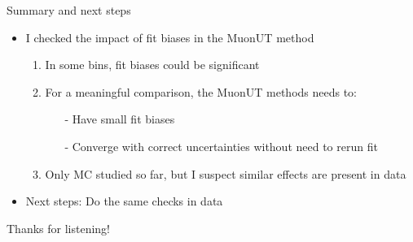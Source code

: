\documentclass[xcolor={dvipsnames}]{beamer}
\begin{document}
\begin{frame}{Summary and next steps}
  \vspace{0.0cm}
  \begin{itemize}
    \setlength\itemsep{1.0em}
    \item{I checked the impact of fit biases in the MuonUT method}
    \begin{enumerate}
      \setlength\itemsep{0.3em}
      \item{In some bins, fit biases could be significant}
      \item{For a meaningful comparison, the MuonUT methods needs to:}
      \begin{itemize}
        \item[-]{Have small fit biases}
        \item[-]{Converge with correct uncertainties without need to rerun fit}
      \end{itemize}
      \item{Only MC studied so far, but I suspect similar effects are present in data}
    \end{enumerate}
    \item{Next steps: Do the same checks in data}
  \end{itemize}
  \vspace{0.3cm}
  \begin{center}
    \Huge Thanks for listening!
  \end{center}
\end{frame}
\end{document}
